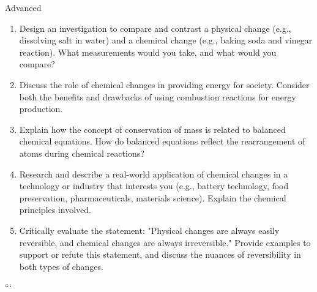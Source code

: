 \begin{tieredquestions}{Advanced}
\begin{enumerate}
    \item  Design an investigation to compare and contrast a physical change (e.g., dissolving salt in water) and a chemical change (e.g., baking soda and vinegar reaction). What measurements would you take, and what would you compare?
    \item  Discuss the role of chemical changes in providing energy for society. Consider both the benefits and drawbacks of using combustion reactions for energy production.
    \item  Explain how the concept of conservation of mass is related to balanced chemical equations. How do balanced equations reflect the rearrangement of atoms during chemical reactions? 
    \item  Research and describe a real-world application of chemical changes in a technology or industry that interests you (e.g., battery technology, food preservation, pharmaceuticals, materials science). Explain the chemical principles involved. 
    \item  Critically evaluate the statement: "Physical changes are always easily reversible, and chemical changes are always irreversible." Provide examples to support or refute this statement, and discuss the nuances of reversibility in both types of changes.
\end{enumerate}
\end{tieredquestions}
```